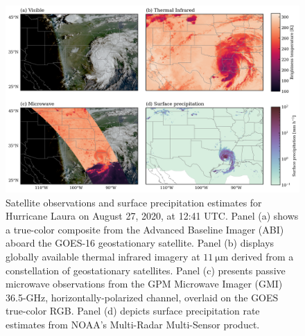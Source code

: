 \documentclass[11pt]{article}
\begin{document}
\begin{figure}[htbp]
	\centering
	\includegraphics[width=1.0\textwidth]{figures/fig01}
	\caption{Satellite observations and surface precipitation estimates for Hurricane Laura on August 27, 2020, at 12:41 UTC. Panel (a) shows a true-color composite from the Advanced Baseline Imager (ABI) aboard the GOES-16 geostationary satellite. Panel (b) displays globally available thermal infrared imagery at $\SI{11}{\micro \meter}$  derived from a constellation of geostationary satellites. Panel (c) presents passive microwave observations from the GPM Microwave Imager (GMI) 36.5-GHz, horizontally-polarized channel, overlaid on the GOES true-color RGB. Panel (d) depicts surface precipitation rate estimates from NOAA’s Multi-Radar Multi-Sensor product.}
	\label{fig:observations_conus}
\end{figure}
\end{document}

